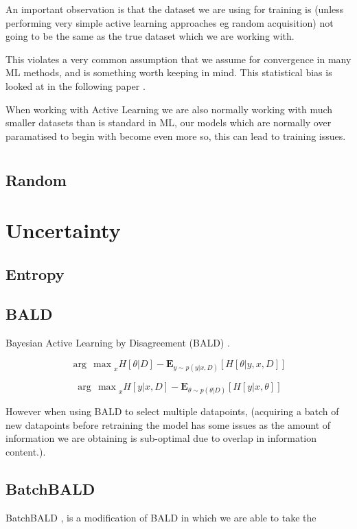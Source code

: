 \documentclass[12pt, a4paper]{report}
\begin{document}
An important observation is that the dataset we are using for training is (unless performing very simple active learning approaches eg random acquisition) not going to be the same as the true dataset which we are working with. 

This violates a very common assumption that we assume for convergence in many ML methods, and is something worth keeping in mind. This statistical bias is looked at in the following paper \cite{farquhar2021statistical}.


When working with Active Learning we are also normally working with much smaller datasets than is standard in ML, our models which are normally over paramatised to begin with become even more so, this can lead to training issues.

\section{}
\subsection{Random}
\subsection{}
\section{Uncertainty}
\subsection{Entropy}
\subsection{BALD}
Bayesian Active Learning by Disagreement (BALD) \cite{houlsby2011bayesian}.

$${\arg\,\max}_x H \left[ \theta | D \right] - \mathbf{E}_{y \sim p(y | x, D)} \left[ H\left[ \theta | y, x, D\right]\right]$$

$${\arg\,\max}_x H \left[ y | x, D \right] - \mathbf{E}_{\theta \sim p(\theta | D)} \left[ H\left[ y | x, \theta \right]\right]$$

However when using BALD to select multiple datapoints, (acquiring a batch of new datapoints before retraining the model has some issues as the amount of information we are obtaining is sub-optimal due to overlap in information content.).
\subsection{BatchBALD}
BatchBALD \cite{kirsch2019batchbald}, is a modification of BALD in which we are able to take the 
\end{document}
